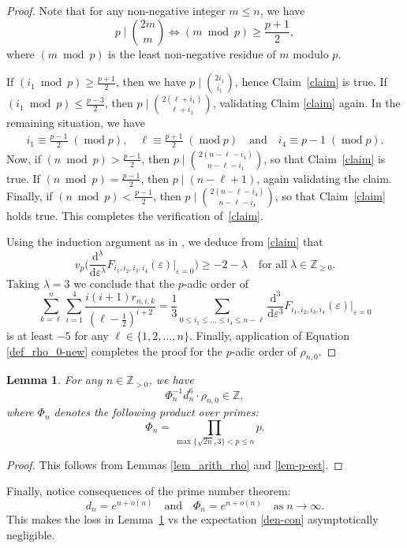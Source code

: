 \documentclass[12pt]{article}
\let\le\leqslant
\let\ge\geqslant
\let\eps\varepsilon
\renewcommand{\d}{\mathrm{d}}
\renewcommand\pmod[1]{\;(\operatorname{mod}#1)}
\newtheorem{lemma}[theorem]{Lemma}
\theoremstyle{remark}
\numberwithin{equation}{section}
\begin{document}
\begin{proof}
Note that for any non-negative integer $m  \le n$, we have
\[
p \mid \binom{2m}{m} \iff (m \bmod p) \ge \frac{p+1}{2},
\]
where $(m \bmod p)$ is the least non-negative residue of $m$ modulo $p$.

If $(i_1 \bmod p) \ge \frac{p+1}{2}$, then we have $p \mid \binom{2i_1}{i_1}$, hence Claim~\eqref{claim} is true. 
If $(i_1 \bmod p) \le \frac{p-3}{2}$, then $p \mid \binom{2(\ell+i_1)}{\ell+i_1}$, validating Claim \eqref{claim} again. 
In the remaining situation, we have
\begin{align*}
i_1 \equiv \frac{p-1}{2} \pmod{p}, \quad
\ell \equiv \frac{p+1}{2} \pmod{p} \quad\text{and}\quad
i_4 \equiv p-1 \pmod{p}.
\end{align*}
Now, if $(n \bmod p) > \frac{p-1}{2}$, then $p \mid \binom{2(n-\ell-i_1)}{n-\ell-i_1}$, so that Claim~\eqref{claim} is true. 
If $(n \bmod p) = \frac{p-1}{2}$, then $p \mid (n-\ell+1)$, again validating the claim. 
Finally, if $(n \bmod p) < \frac{p-1}{2}$, then $p \mid \binom{2(n-\ell-i_4)}{n-\ell-i_4}$, so that Claim~\eqref{claim} holds true. 
This completes the verification of~\eqref{claim}.

Using the induction argument as in \cite[Lemma 17]{Zud2004}, we deduce from \eqref{claim} that
\[
v_p\bigg( \frac{\d^{\lambda}}{\d\eps^{\lambda}} F_{i_1,i_2,i_3,i_4}(\eps) \bigg|_{\eps = 0} \bigg) \ge -2-\lambda \quad \text{for all}\; \lambda \in \mathbb{Z}_{\ge 0}.
\]
Taking $\lambda = 3$ we conclude that the $p$-adic order of
\[
\sum_{k=\ell}^{n}\sum_{i=1}^{4}\frac{i(i+1)r_{n,i,k}}{(\ell -\frac{1}{2})^{i+2}}
=\frac13\sum_{0 \le i_1 \le \dots \le i_4 \le n-\ell} \frac{\d^3}{\d\eps^3}F_{i_1,i_2,i_3,i_4}(\eps)\bigg|_{\eps = 0}
\]
is at least $-5$ for any $\ell\in\{1,2,\dots,n\}$.
Finally, application of Equation \eqref{def_rho_0-new} completes the proof for the $p$-adic order of $\rho_{n,0}$.
\end{proof}

\begin{lemma}
\label{almost_GDC}
For any $n \in \mathbb{Z}_{>0}$, we have
\[ 
\Phi_n^{-1} d_n^6 \cdot \rho_{n,0} \in \mathbb{Z}, 
\]
where $\Phi_n$ denotes the following product over primes:
\[
\Phi_n = \prod_{\max\{\sqrt{2n},3\}<p \le n} p. 
\]
\end{lemma}

\begin{proof}
This follows from Lemmas \ref{lem_arith_rho} and \ref{lem-p-est}.
\end{proof}

Finally, notice consequences of the prime number theorem:
\begin{equation}
d_n = e^{n + o(n)} \quad\text{and}\quad
\Phi_n = e^{n + o(n)} \quad\text{as}\; n \to \infty.
\label{eq:PNT}
\end{equation}
This makes the loss in Lemma~\ref{almost_GDC} vs the expectation \eqref{den-con} asymptotically negligible.
\end{document}
